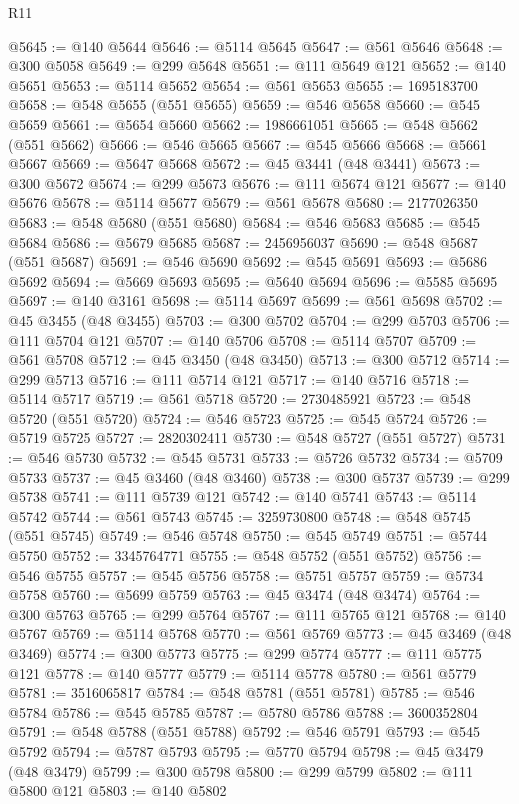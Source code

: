 \begin{lexlean}{R11}
\begin{coremodule}
@5645 := @140 @5644
@5646 := @5114 @5645
@5647 := @561 @5646
@5648 := @300 @5058
@5649 := @299 @5648
@5651 := @111 @5649 @121
@5652 := @140 @5651
@5653 := @5114 @5652
@5654 := @561 @5653
@5655 := 1695183700
@5658 := @548 @5655 (@551 @5655)
@5659 := @546 @5658
@5660 := @545 @5659
@5661 := @5654 @5660
@5662 := 1986661051
@5665 := @548 @5662 (@551 @5662)
@5666 := @546 @5665
@5667 := @545 @5666
@5668 := @5661 @5667
@5669 := @5647 @5668
@5672 := @45 @3441 (@48 @3441)
@5673 := @300 @5672
@5674 := @299 @5673
@5676 := @111 @5674 @121
@5677 := @140 @5676
@5678 := @5114 @5677
@5679 := @561 @5678
@5680 := 2177026350
@5683 := @548 @5680 (@551 @5680)
@5684 := @546 @5683
@5685 := @545 @5684
@5686 := @5679 @5685
@5687 := 2456956037
@5690 := @548 @5687 (@551 @5687)
@5691 := @546 @5690
@5692 := @545 @5691
@5693 := @5686 @5692
@5694 := @5669 @5693
@5695 := @5640 @5694
@5696 := @5585 @5695
@5697 := @140 @3161
@5698 := @5114 @5697
@5699 := @561 @5698
@5702 := @45 @3455 (@48 @3455)
@5703 := @300 @5702
@5704 := @299 @5703
@5706 := @111 @5704 @121
@5707 := @140 @5706
@5708 := @5114 @5707
@5709 := @561 @5708
@5712 := @45 @3450 (@48 @3450)
@5713 := @300 @5712
@5714 := @299 @5713
@5716 := @111 @5714 @121
@5717 := @140 @5716
@5718 := @5114 @5717
@5719 := @561 @5718
@5720 := 2730485921
@5723 := @548 @5720 (@551 @5720)
@5724 := @546 @5723
@5725 := @545 @5724
@5726 := @5719 @5725
@5727 := 2820302411
@5730 := @548 @5727 (@551 @5727)
@5731 := @546 @5730
@5732 := @545 @5731
@5733 := @5726 @5732
@5734 := @5709 @5733
@5737 := @45 @3460 (@48 @3460)
@5738 := @300 @5737
@5739 := @299 @5738
@5741 := @111 @5739 @121
@5742 := @140 @5741
@5743 := @5114 @5742
@5744 := @561 @5743
@5745 := 3259730800
@5748 := @548 @5745 (@551 @5745)
@5749 := @546 @5748
@5750 := @545 @5749
@5751 := @5744 @5750
@5752 := 3345764771
@5755 := @548 @5752 (@551 @5752)
@5756 := @546 @5755
@5757 := @545 @5756
@5758 := @5751 @5757
@5759 := @5734 @5758
@5760 := @5699 @5759
@5763 := @45 @3474 (@48 @3474)
@5764 := @300 @5763
@5765 := @299 @5764
@5767 := @111 @5765 @121
@5768 := @140 @5767
@5769 := @5114 @5768
@5770 := @561 @5769
@5773 := @45 @3469 (@48 @3469)
@5774 := @300 @5773
@5775 := @299 @5774
@5777 := @111 @5775 @121
@5778 := @140 @5777
@5779 := @5114 @5778
@5780 := @561 @5779
@5781 := 3516065817
@5784 := @548 @5781 (@551 @5781)
@5785 := @546 @5784
@5786 := @545 @5785
@5787 := @5780 @5786
@5788 := 3600352804
@5791 := @548 @5788 (@551 @5788)
@5792 := @546 @5791
@5793 := @545 @5792
@5794 := @5787 @5793
@5795 := @5770 @5794
@5798 := @45 @3479 (@48 @3479)
@5799 := @300 @5798
@5800 := @299 @5799
@5802 := @111 @5800 @121
@5803 := @140 @5802

\end{coremodule}
\end{lexlean}
